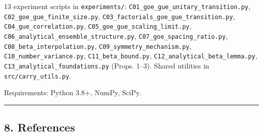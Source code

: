 \documentclass[
  11pt,
]{article}
\begin{document}
13 experiment scripts in \texttt{experiments/}:
\texttt{C01\_goe\_gue\_unitary\_transition.py},
\texttt{C02\_goe\_gue\_finite\_size.py},
\texttt{C03\_factorials\_goe\_gue\_transition.py},
\texttt{C04\_gue\_correlation.py}, \texttt{C05\_goe\_gue\_scaling\_limit.py},
\texttt{C06\_analytical\_ensemble\_structure.py},
\texttt{C07\_goe\_spacing\_ratio.py}, \texttt{C08\_beta\_interpolation.py},
\texttt{C09\_symmetry\_mechanism.py}, \texttt{C10\_number\_variance.py},
\texttt{C11\_beta\_bound.py}, \texttt{C12\_analytical\_beta\_lemma.py},
\texttt{C13\_analytical\_foundations.py} (Props. 1--3). Shared utilities in
\texttt{src/carry\_utils.py}.

Requirements: Python 3.8+, NumPy, SciPy.

\begin{center}\rule{0.5\linewidth}{0.5pt}\end{center}

\newpage

\subsection{8. References}\label{references}
\end{document}
